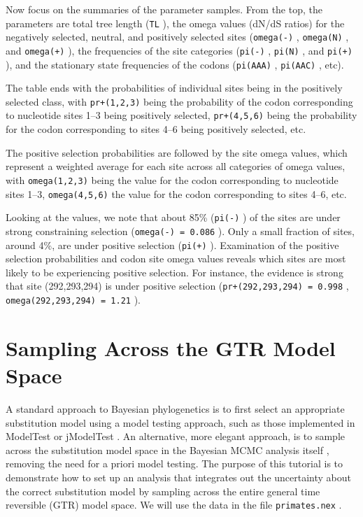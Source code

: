 \documentclass[12pt]{book}
\newcommand{\ttt}[1]{\texttt{#1} }
\begin{document}
Now focus on the summaries of the parameter samples. From the top, the parameters are
total tree length (\ttt{TL}), the omega values (dN/dS ratios) for the negatively selected, neutral, and
positively selected sites (\ttt{omega(-)}, \ttt{omega(N)}, and \ttt{omega(+)}), the frequencies of the site categories
(\ttt{pi(-)}, \ttt{pi(N)}, and \ttt{pi(+)}), and the stationary state frequencies of the codons (\ttt{pi(AAA)}, 
\ttt{pi(AAC)}, etc).

The table ends with the probabilities of individual sites being in the positively selected class, with
\ttt{pr+(1,2,3)} being the probability of the codon corresponding to nucleotide sites 1--3 being positively
selected, \ttt{pr+(4,5,6)} being the probability for the codon corresponding to sites 4--6 being
positively selected, etc.

The positive selection probabilities are followed by the site omega values, which represent a weighted
average for each site across all categories of omega values, with \ttt{omega(1,2,3)} being the value for the codon
corresponding to nucleotide sites 1--3, \ttt{omega(4,5,6)} the value for the codon corresponding to sites
4--6, etc.

Looking at the values, we note that about 85\% (\ttt{pi(-)}) of the sites are under strong constraining selection
(\ttt{omega(-) = 0.086}). Only a small fraction of sites, around 4\%, are under positive selection (\ttt{pi(+)}).
Examination of the positive selection probabilities and codon site omega values reveals which sites
are most likely to be experiencing positive selection. For instance, the evidence is strong that site (292,293,294)
is under positive selection (\ttt{pr+(292,293,294) = 0.998}, \ttt{omega(292,293,294) = 1.21}).

\section{Sampling Across the GTR Model Space}

A standard approach to Bayesian phylogenetics is to first select an appropriate substitution model using
a model testing approach, such as those implemented in ModelTest or jModelTest \citep{posada98, posada08}. An
alternative, more elegant approach, is to sample across the substitution model space in the Bayesian MCMC
analysis itself \citep{huelsenbeck04d}, removing the need for a priori model testing. The purpose of this
tutorial is to demonstrate how to set up an analysis that integrates out the uncertainty about the correct
substitution model by sampling across the entire general time reversible (GTR) model space.
We will use the data in the file \ttt{primates.nex}.
\end{document}
